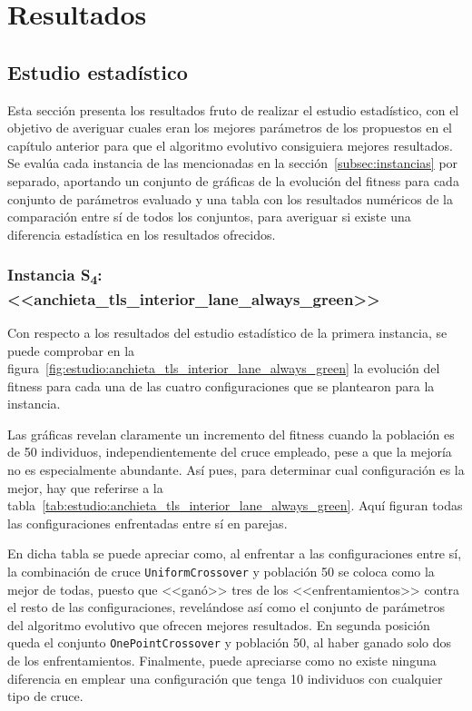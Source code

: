 \chapter{Resultados}
\label{cap:4-resultados}

\section{Estudio estadístico}

Esta sección presenta los resultados fruto de realizar el estudio estadístico, con el objetivo de averiguar cuales eran los mejores parámetros de los propuestos en el capítulo anterior para que el algoritmo evolutivo consiguiera mejores resultados. Se evalúa cada instancia de las mencionadas en la sección~\ref{subsec:instancias} por separado, aportando un conjunto de gráficas de la evolución del fitness para cada conjunto de parámetros evaluado y una tabla con los resultados numéricos de la comparación entre sí de todos los conjuntos, para averiguar si existe una diferencia estadística en los resultados ofrecidos.

\subsection{Instancia S\textsubscript{4}: <<anchieta\_tls\_interior\_lane\_always\_green>>}


Con respecto a los resultados del estudio estadístico de la primera instancia, se puede comprobar en la figura~\ref{fig:estudio:anchieta_tls_interior_lane_always_green} la evolución del fitness para cada una de las cuatro configuraciones que se plantearon para la instancia. 

Las gráficas revelan claramente un incremento del fitness cuando la población es de 50 individuos, independientemente del cruce empleado, pese a que la mejoría no es especialmente abundante. Así pues, para determinar cual configuración es la mejor, hay que referirse a la tabla~\ref{tab:estudio:anchieta_tls_interior_lane_always_green}. Aquí figuran todas las configuraciones enfrentadas entre sí en parejas.

En dicha tabla se puede apreciar como, al enfrentar a las configuraciones entre sí, la combinación de cruce \texttt{UniformCrossover} y población 50 se coloca como la mejor de todas, puesto que <<ganó>> tres de los <<enfrentamientos>> contra el resto de las configuraciones, revelándose así como el conjunto de parámetros del algoritmo evolutivo que ofrecen mejores resultados. En segunda posición queda el conjunto \texttt{OnePointCrossover} y población 50, al haber ganado solo dos de los enfrentamientos. Finalmente, puede apreciarse como no existe ninguna diferencia en emplear una configuración que tenga 10 individuos con cualquier tipo de cruce.


